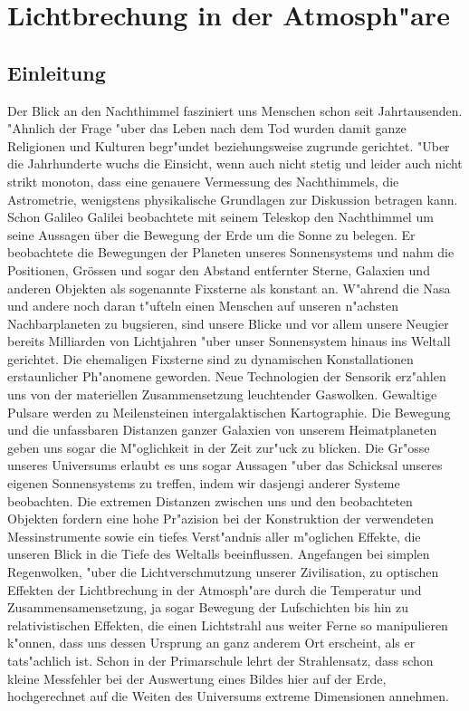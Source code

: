 \chapter{Lichtbrechung in der Atmosph"are\label{chapter:licht}}
\begin{refsection}


\section{Einleitung}
Der Blick an den Nachthimmel fasziniert uns Menschen schon seit Jahrtausenden. "Ahnlich der Frage "uber das Leben nach dem Tod wurden damit ganze Religionen und Kulturen begr"undet beziehungsweise zugrunde gerichtet. 
"Uber die Jahrhunderte wuchs die Einsicht, wenn auch nicht stetig und leider auch nicht strikt monoton, dass eine genauere Vermessung des Nachthimmels, die Astrometrie, wenigstens physikalische Grundlagen zur Diskussion betragen kann. 
Schon Galileo Galilei beobachtete mit seinem Teleskop den Nachthimmel um seine Aussagen über die Bewegung der Erde um die Sonne zu belegen.
Er beobachtete die Bewegungen der Planeten unseres Sonnensystems und nahm die Positionen, Grössen und sogar den Abstand entfernter Sterne, Galaxien und anderen Objekten als sogenannte Fixsterne als konstant an. 
W"ahrend die Nasa und andere noch daran t"ufteln einen Menschen auf unseren n"achsten Nachbarplaneten zu bugsieren, sind unsere Blicke und vor allem unsere Neugier bereits Milliarden von Lichtjahren "uber unser Sonnensystem hinaus ins Weltall gerichtet. 
Die ehemaligen Fixsterne sind zu dynamischen Konstallationen erstaunlicher Ph"anomene geworden.
Neue Technologien der Sensorik erz"ahlen uns von der materiellen Zusammensetzung leuchtender Gaswolken. 
Gewaltige Pulsare werden zu Meilensteinen intergalaktischen Kartographie. 
Die Bewegung und die unfassbaren Distanzen ganzer Galaxien von unserem Heimatplaneten geben uns sogar die M"oglichkeit in der Zeit zur"uck zu blicken.
Die Gr"osse unseres Universums  erlaubt es uns sogar Aussagen "uber das Schicksal unseres eigenen Sonnensystems zu treffen, indem wir dasjengi anderer Systeme beobachten. 
Die extremen Distanzen zwischen uns und den beobachteten Objekten fordern eine hohe Pr"azision bei der Konstruktion der verwendeten Messinstrumente sowie ein tiefes Verst"andnis aller m"oglichen Effekte, die unseren Blick in die Tiefe des Weltalls beeinflussen. 
Angefangen bei simplen Regenwolken, "uber die Lichtverschmutzung unserer Zivilisation, zu optischen Effekten der Lichtbrechung in der Atmosph"are durch die Temperatur und Zusammensamensetzung, ja sogar Bewegung der Lufschichten bis hin zu relativistischen Effekten, die einen Lichtstrahl aus weiter Ferne so manipulieren k"onnen, dass uns dessen Ursprung an ganz anderem Ort erscheint, als er tats"achlich ist. 
Schon in der Primarschule lehrt der Strahlensatz, dass schon kleine Messfehler bei der Auswertung eines Bildes hier auf der Erde, hochgerechnet auf die Weiten des Universums extreme Dimensionen annehmen.
 

\end{refsection}
